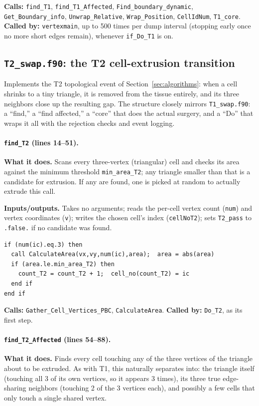 \documentclass[11pt]{article}
\begin{document}
\textbf{Calls:} \texttt{find\_T1}, \texttt{find\_T1\_Affected},
\texttt{Find\_boundary\_dynamic}, \texttt{Get\_Boundary\_info}, \texttt{Unwrap\_Relative},
\texttt{Wrap\_Position}, \texttt{CellIdNum}, \texttt{T1\_core}. \textbf{Called by:}
\texttt{vertexmain}, up to 500 times per dump interval (stopping early once no more
short edges remain), whenever \texttt{if\_Do\_T1} is on.
\subsection{\texttt{T2\_swap.f90}: the T2 cell-extrusion transition}
\label{sec:codet2}

Implements the T2 topological event of Section~\ref{sec:algorithms}: when a cell shrinks to
a tiny triangle, it is removed from the tissue entirely, and its three neighbors close
up the resulting gap. The structure closely mirrors \texttt{T1\_swap.f90}: a
``find,'' a ``find affected,'' a ``core'' that does the actual surgery, and a ``Do''
that wraps it all with the rejection checks and event logging.

\paragraph{\texttt{find\_T2} (lines 14--51).}
\textbf{What it does.} Scans every three-vertex (triangular) cell and checks its area
against the minimum threshold \texttt{min\_area\_T2}; any triangle smaller than that is
a candidate for extrusion. If any are found, one is picked at random to actually
extrude this call.

\textbf{Inputs/outputs.} Takes no arguments; reads the per-cell vertex count
(\texttt{num}) and vertex coordinates (\texttt{v}); writes the chosen cell's index
(\texttt{cellNoT2}); sets \texttt{T2\_pass} to \texttt{.false.} if no candidate was
found.

\begin{lstlisting}[caption={The area-threshold candidate test in \texttt{find\_T2}.}]
if (num(ic).eq.3) then
  call CalculateArea(vx,vy,num(ic),area);  area = abs(area)
  if (area.le.min_area_T2) then
    count_T2 = count_T2 + 1;  cell_no(count_T2) = ic
  end if
end if
\end{lstlisting}

\textbf{Calls:} \texttt{Gather\_Cell\_Vertices\_PBC}, \texttt{CalculateArea}.
\textbf{Called by:} \texttt{Do\_T2}, as its first step.

\paragraph{\texttt{find\_T2\_Affected} (lines 54--88).}
\textbf{What it does.} Finds every cell touching any of the three vertices of the
triangle about to be extruded. As with T1, this naturally separates into: the triangle
itself (touching all 3 of its own vertices, so it appears 3 times), its three true
edge-sharing neighbors (touching 2 of the 3 vertices each), and possibly a few
cells that only touch a single shared vertex.
\end{document}
